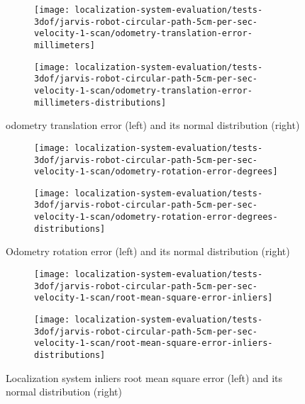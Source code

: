 \begin{figure}[ht]
	\centering
	\begin{subfigure}[h]{.497\textwidth}
		\centering
		\texttt{[image: localization-system-evaluation/tests-3dof/jarvis-robot-circular-path-5cm-per-sec-velocity-1-scan/odometry-translation-error-millimeters]}
	\end{subfigure}
	\begin{subfigure}[h]{.497\textwidth}
		\centering
		\texttt{[image: localization-system-evaluation/tests-3dof/jarvis-robot-circular-path-5cm-per-sec-velocity-1-scan/odometry-translation-error-millimeters-distributions]}
	\end{subfigure}
	\caption{odometry translation error (left) and its normal distribution (right)}
	\label{fig:localization-system-evaluation_jarvis-robot-circular-path-5cm-per-sec-velocity-1-scan_odometry-translation-errors}
\end{figure}

\begin{figure}[ht]
	\centering
	\begin{subfigure}[h]{.497\textwidth}
		\centering
		\texttt{[image: localization-system-evaluation/tests-3dof/jarvis-robot-circular-path-5cm-per-sec-velocity-1-scan/odometry-rotation-error-degrees]}
	\end{subfigure}
	\begin{subfigure}[h]{.497\textwidth}
		\centering
		\texttt{[image: localization-system-evaluation/tests-3dof/jarvis-robot-circular-path-5cm-per-sec-velocity-1-scan/odometry-rotation-error-degrees-distributions]}
	\end{subfigure}
	\caption{Odometry rotation error (left) and its normal distribution (right)}
	\label{fig:localization-system-evaluation_jarvis-robot-circular-path-5cm-per-sec-velocity-1-scan_odometry-rotation-errors}
\end{figure}

\begin{figure}[ht]
	\centering
	\begin{subfigure}[h]{.497\textwidth}
		\centering
		\texttt{[image: localization-system-evaluation/tests-3dof/jarvis-robot-circular-path-5cm-per-sec-velocity-1-scan/root-mean-square-error-inliers]}
	\end{subfigure}
	\begin{subfigure}[h]{.497\textwidth}
		\centering
		\texttt{[image: localization-system-evaluation/tests-3dof/jarvis-robot-circular-path-5cm-per-sec-velocity-1-scan/root-mean-square-error-inliers-distributions]}
	\end{subfigure}
	\caption{Localization system inliers root mean square error (left) and its normal distribution (right)}
	\label{fig:localization-system-evaluation_jarvis-robot-circular-path-5cm-per-sec-velocity-1-scan_inliers-rmse}
\end{figure}

